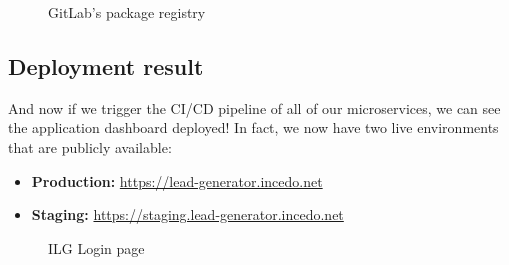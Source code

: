 \begin{figure}[H]
    \centering
    \caption{GitLab's package registry}
    \label{fig:gitlab-package-registry}
\end{figure}
\newpage

\subsection{Deployment result}
And now if we trigger the CI/CD pipeline of all of our microservices, we can see the application dashboard deployed!
In fact, we now have two live environments that are publicly available:
\begin{itemize}
    \item \textbf{Production:} \url{https://lead-generator.incedo.net}
    \item \textbf{Staging:} \url{https://staging.lead-generator.incedo.net}
\end{itemize}

\begin{figure}[H]
    \centering
    \caption{ILG Login page}
    \label{fig:login-page}
\end{figure}


